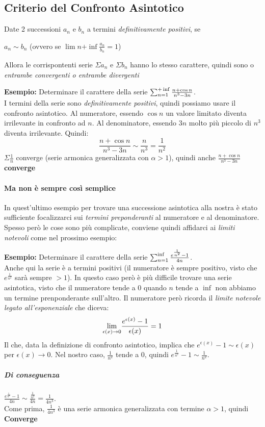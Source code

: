 \documentclass[12pt, a4paper, openany]{book}
\newcommand{\esempio}[1]{\begin{box_esempio} \textbf{Esempio: }#1\end{box_esempio}}
\newcommand{\definizione}[1]{\begin{box_definizione} #1 \end{box_definizione}}
\begin{document}
\subsection{Criterio del Confronto Asintotico}
\definizione{
Date 2 successioni $a_n$ e $b_n$ a termini \emph{definitivamente positivi}, se 
\begin{center}
    $a_n \sim b_n$ (ovvero se $\lim{n}{+\inf} \frac{a_n}{b_n} = 1$)
\end{center}
Allora le corrispontenti serie $\Sigma a_n$ e $\Sigma b_n$ hanno lo stesso carattere, quindi sono o \emph{entrambe convergenti o entrambe divergenti}
}
\esempio{
    Determinare il carattere della serie $\sum_{n=1}^{+\inf} \frac{n+ \cos n}{n^3 - 3n}$.\\
    I termini della serie sono \emph{definitivamente positivi}, quindi possiamo usare il confronto asintotico.
    Al numeratore, essendo $\cos n$ un valore limitato diventa irrilevante in confronto ad $n$.
    Al denominatore, essendo $3n$ molto più piccolo di $n^3$ diventa irrilevante. 
    Quindi:
    \begin{equation*}
        \frac{n+\cos n}{n^3 - 3n} \sim \frac{n}{n^3} = \frac{1}{n^2}
    \end{equation*}
    $\Sigma \frac{1}{n}$ converge (serie armonica generalizzata con $\alpha > 1$), quindi anche $\frac{n+\cos n}{n^3 - 3n}$ \textbf{converge}
}
\paragraph{Ma non è sempre così semplice}In quest'ultimo esempio per trovare una successione asintotica alla nostra è stato sufficiente focalizzarci sui \emph{termini preponderanti} al numeratore e al denominatore.
Spesso però le cose sono più complicate, conviene quindi affidarci ai \emph{limiti notevoli} come nel prossimo esempio:
\esempio{
    Determinare il carattere della serie $\sum_{n=1}^{\inf} \frac{e^{\frac{1}{n^2}} -1}{4n}$.\\
    Anche qui la serie è a termini positivi (il numeratore è sempre positivo, visto che $e^\frac{1}{n^2}$ sarà sempre $ > 1$).
    In questo caso però è più difficile trovare una serie asintotica, visto che il numeratore tende a 0 quando $n$ tende a $\inf$ non abbiamo un termine prenponderante sull'altro.
    Il numeratore però ricorda il \emph{limite notevole legato all'esponenziale} che diceva:
    \begin{equation*}
        \underset{\epsilon(x) \to 0}{\lim} \frac{e^{\epsilon(x)}-1}{\epsilon(x)} = 1
    \end{equation*}
    Il che, data la definizione di confronto asintotico, implica che $e^{\epsilon(x)}-1 \sim \epsilon(x)$ per $\epsilon(x) \to 0$.
    Nel nostro caso, $\frac{1}{n^2}$ tende a $0$, quindi $e^{\frac{1}{n^2}} -1 \sim \frac{1}{n^2}$.\\
    \subparagraph*{Di conseguenza} $\frac{e^{\frac{1}{n^2}} -1}{4n} \sim \frac{\frac{1}{n^2}}{4n} = \frac{1}{4n^3}$.\\
    Come prima, $\frac{1}{4n^3}$ è una serie armonica generalizzata con termine $\alpha > 1$, quindi \textbf{Converge}
}
\end{document}
